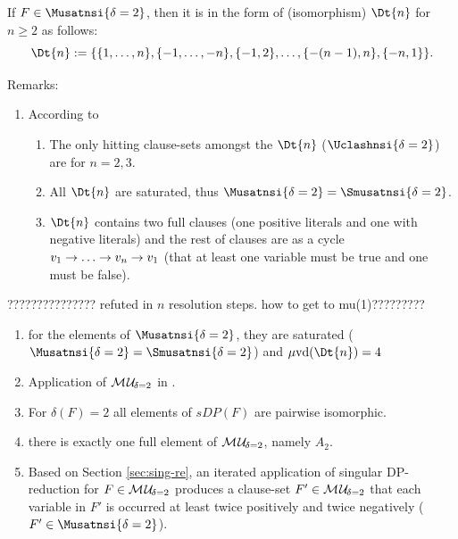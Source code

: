 \documentclass{report}
\begin{document}
\begin{lem}\label{lem:mu2-Fn}
\cite{h24} If $F \in \Musatnsi{\delta=2}$, then it is in the form of (isomorphism) $\Dt{n}$  for $n \ge 2$ as follows:
  \begin{displaymath}
    \Dt{n} := \set{\set{1,\dots,n},\set{-1,\dots,-n},\set{-1,2}, \dots, \set{-(n-1),n}, \set{-n,1}}.
  \end{displaymath}

\end{lem}
Remarks:
  \begin{enumerate}
  \item According to \cite{h9}
  \begin{enumerate}
  \item The only hitting clause-sets amongst the $\Dt{n}$ ($\Uclashnsi{\delta=2}$) are for $n=2,3$. 
  \item All $\Dt{n}$ are saturated, thus $\Musatnsi{\delta=2} = \Smusatnsi{\delta=2}$. 
  \item $\Dt{n}$ contains two full clauses (one positive literals and one with negative literals) and the rest of clauses are as a cycle $v_1 \ra \dots \ra v_n \ra v_1$ (that at least one variable must be true and one must be false).
  \end{enumerate} 
  \end{enumerate} 
  
\begin{lem}\label{lem:mu2-refu-tree}
??????????????? refuted in $n$ resolution steps. how to get to mu(1)?????????
\end{lem}

  \begin{enumerate}
  \item for the elements of $\Musatnsi{\delta=2}$, they are saturated ($\Musatnsi{\delta=2} = \Smusatnsi{\delta=2}$) and $\minvdeg(\Dt{n}) = 4$
  \item Application of $\mathcal{M\hspace{0.8pt}U}_{\!\delta=2}$ in \cite{h29}.
  \item For $\delta(F) = 2$ all elements of $sDP(F)$ are pairwise isomorphic.
  \item there is exactly one full element of $\mathcal{M\hspace{0.8pt}U}_{\!\delta=2}$, namely $A_2$.
  \item Based on Section \ref{sec:sing-re}, an iterated application of singular DP-reduction for $F \in \mathcal{M\hspace{0.8pt}U}_{\!\delta=2}$ produces a clause-set $F' \in \mathcal{M\hspace{0.8pt}U}_{\!\delta=2}$ that each variable in $F'$ is occurred at least twice positively and twice negatively ($F' \in  \Musatnsi{\delta=2}$).
  \end{enumerate}
\end{document}
